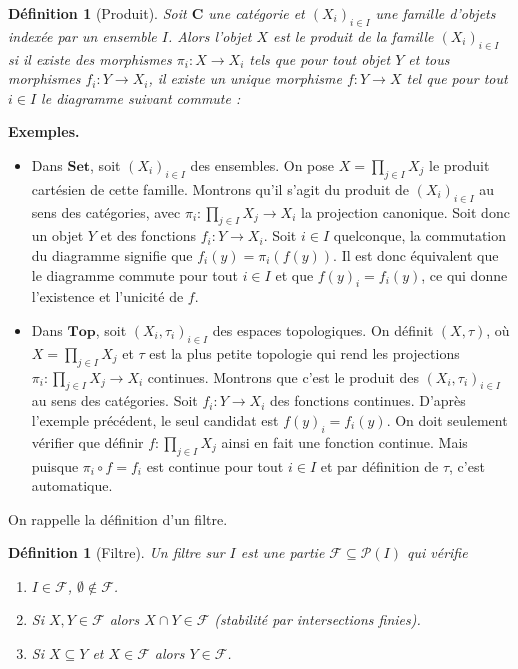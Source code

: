 \documentclass[11pt,a4paper]{article}
\newtheorem{defi}[theo]{Définition}
\newcommand{\F}{\mathcal{F}}
\newcommand{\gr}{\textbf}
\renewcommand{\P}{\mathcal{P}}
\newcommand{\1}{\mathbbm{1}}
\begin{document}
\begin{defi}[Produit]
Soit $\gr{C}$ une catégorie et $(X_i)_{i\in I}$ une famille d'objets indexée par un ensemble $I$. Alors l'objet $X$ est le produit de la famille $(X_i)_{i\in I}$ si il existe des morphismes $\pi_i : X \to X_i$ tels que pour tout objet $Y$ et tous morphismes $f_i : Y \to X_i$, il existe un unique morphisme $f : Y \to X$ tel que pour tout $i \in I$ le diagramme suivant commute :

\begin{center}
\end{center}
\end{defi}
\gr{Exemples.} 
\begin{itemize}
\item[$\bullet$] Dans $\gr{Set}$, soit $(X_i)_{i\in I}$ des ensembles. On pose $X = \prod_{j\in I} X_j$ le produit cartésien de cette famille. Montrons qu'il s'agit du produit de $(X_i)_{i\in I}$ au sens des catégories, avec $\pi_i : \prod_{j\in I} X_j \to X_i$ la projection canonique. Soit donc un objet $Y$ et des fonctions $f_i : Y \to X_i$. Soit $i \in I$ quelconque, la commutation du diagramme signifie que $f_i(y) = \pi_i(f(y))$. Il est donc équivalent que le diagramme commute pour tout $i \in I$ et que $f(y)_i = f_i(y)$, ce qui donne l'existence et l'unicité de $f$.
\item[$\bullet$] Dans $\gr{Top}$, soit $(X_i,\tau_i)_{i\in I}$ des espaces topologiques. On définit $(X,\tau)$, où $X = \prod_{j\in I} X_j$ et $\tau$ est la plus petite topologie qui rend les projections $\pi_i : \prod_{j\in I} X_j \to X_i$ continues. Montrons que c'est le produit des $(X_i,\tau_i)_{i\in I}$ au sens des catégories. Soit $f_i : Y \to X_i$ des fonctions continues. D'après l'exemple précédent, le seul candidat est $f(y)_i = f_i(y)$. On doit seulement vérifier que définir $f : \prod_{j\in I} X_j$ ainsi en fait une fonction continue. Mais puisque $\pi_i \circ f = f_i$ est continue pour tout $i \in I$ et par définition de $\tau$, c'est automatique.
\end{itemize}

On rappelle la définition d'un filtre.
\begin{defi}[Filtre]
Un filtre sur $I$ est une partie $\F \subseteq \P(I)$ qui vérifie
\begin{enumerate}
\setlength\itemsep{-0.3em}
\item[(i)] $I \in \F$, $\emptyset \notin \F$.
\item[(ii)] Si $X,Y \in \F$ alors $X \cap Y \in \F$ (stabilité par intersections finies).
\item[(iii)] Si $X \subseteq Y$ et $X \in \F$ alors $Y \in \F$.
\end{enumerate}
\end{defi}
\end{document}
